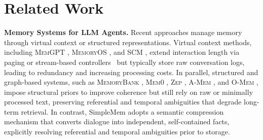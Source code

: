 \documentclass{article}
\newcommand{\ours}{SimpleMem}
\theoremstyle{plain}
\theoremstyle{definition}
\theoremstyle{remark}
\begin{document}



\vspace{-0.3em}
\section{Related Work}
\vspace{-0.3em}
\label{sec:related_work}

\textbf{Memory Systems for LLM Agents.} Recent approaches manage memory through virtual context or structured representations. Virtual context methods, including \textsc{MemGPT} \cite{Packer2023MemGPTTL}, \textsc{MemoryOS} \cite{memoryos}, and \textsc{SCM} \cite{wang2023enhancing}, extend interaction length via paging or stream-based controllers~\cite{wang2024agent} but typically store raw conversation logs, leading to redundancy and increasing processing costs. In parallel, structured and graph-based systems, such as \textsc{MemoryBank} \cite{memorybank}, \textsc{Mem0} \cite{mem0}, \textsc{Zep} \cite{rasmussen2025zep}, \textsc{A-Mem} \cite{Xu2025AMEMAM}, and \textsc{O-Mem} \cite{omem}, impose structural priors to improve coherence but still rely on raw or minimally processed text, preserving referential and temporal ambiguities that degrade long-term retrieval. In contrast, \ours{} adopts a semantic compression mechanism that converts dialogue into independent, self-contained facts, explicitly resolving referential and temporal ambiguities prior to storage.
\end{document}
